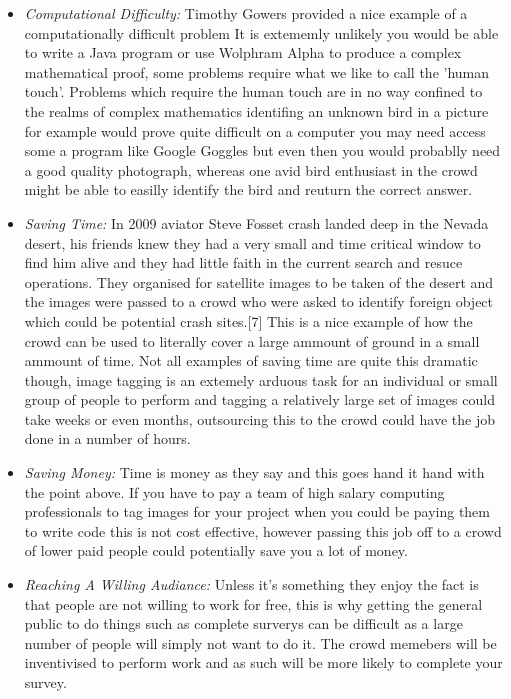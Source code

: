 \documentclass[11pt]{article}
\begin{document}
\begin{itemize}
\item
\emph{Computational Difficulty:} Timothy Gowers provided a nice example of a computationally difficult problem It is extememly unlikely you
would be able to write a Java program or use Wolphram Alpha to produce a complex mathematical proof, some problems require what we like to call
the 'human touch'. Problems which require the human touch are in no way confined to the realms of complex mathematics identifing an unknown
bird in a picture for example would prove quite difficult on a computer you may need access some a program like Google Goggles but even then you 
would probablly need a good quality photograph, whereas one avid bird enthusiast in the crowd might be able to easilly identify the bird and
reuturn the correct answer.
\item
\emph{Saving Time:} In 2009 aviator Steve Fosset crash landed deep in the Nevada desert, his friends knew they had a very small
and time critical window to find him alive and they had little faith in the current search and resuce operations. They organised for satellite 
images to be taken of the desert and the images were passed to a crowd who were asked to identify foreign object which could be potential crash 
sites.[7] This is a nice example of how the crowd can be used to literally cover a large ammount of ground in a small ammount of time. Not all 
examples of saving time are quite this dramatic though, image tagging is an extemely arduous task for an individual or small group of people 
to perform and tagging a relatively large set of images could take weeks or even months, outsourcing this to the crowd could have the job 
done in a number of hours.
\item
\emph{Saving Money:} Time is money as they say and this goes hand it hand with the point above. If you have to pay a team of high salary computing
professionals to tag images for your project when you could be paying them to write code this is not cost effective, however passing this job off
to a crowd of lower paid people could potentially save you a lot of money. 
\item
\emph{Reaching A Willing Audiance:} Unless it's something they enjoy the fact is that people are not willing to work for free, this is why
getting the general public to do things such as complete surverys can be difficult as a large number of people will simply not want to do it. The
crowd memebers will be inventivised to perform work and as such will be more likely to complete your survey.
\end{itemize}
\end{document}
